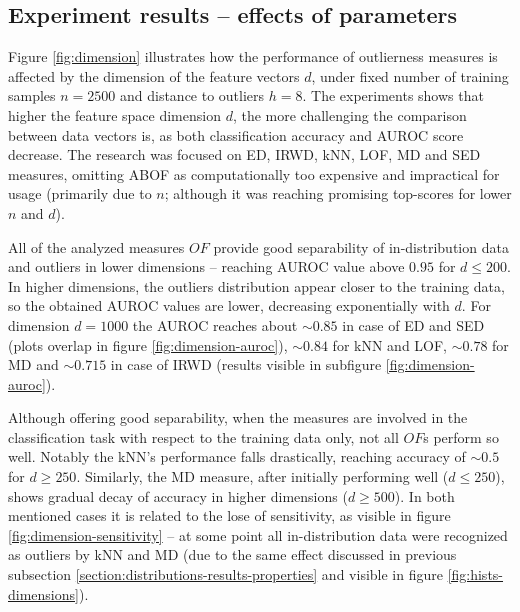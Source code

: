 \subsection{Experiment results – effects of parameters}
\label{section:distributions-results-trends}

Figure \ref{fig:dimension} illustrates how the performance of outlierness measures is affected by the dimension of the feature vectors $d$, under fixed number of training samples $n = 2500$ and distance to outliers $h = 8$. The experiments shows that higher the feature space dimension $d$, the more challenging the comparison between data vectors is, as both classification accuracy and AUROC score decrease. The research was focused on ED, IRWD, kNN, LOF, MD and SED measures, omitting ABOF as computationally too expensive and impractical for usage (primarily due to $n$; although it was reaching promising top-scores for lower $n$ and $d$).

All of the analyzed measures $OF$ provide good separability of in-distribution data and outliers in lower dimensions – reaching AUROC value above $0.95$ for $d \leq 200$. In higher dimensions, the outliers distribution appear closer to the training data, so the obtained AUROC values are lower, decreasing exponentially with $d$. For dimension $d = 1000$ the AUROC reaches about ${\sim}0.85$ in case of ED and SED (plots overlap in figure \ref{fig:dimension-auroc}), ${\sim}0.84$ for kNN and LOF, ${\sim}0.78$ for MD and ${\sim}0.715$ in case of IRWD (results visible in subfigure \ref{fig:dimension-auroc}).

Although offering good separability, when the measures are involved in the classification task with respect to the training data only, not all $OF$s perform so well. Notably the kNN's performance falls drastically, reaching accuracy of ${\sim}0.5$ for $d \geq 250$. Similarly, the MD measure, after initially performing well ($d \leq 250$), shows gradual decay of accuracy in higher dimensions ($d \geq 500$). In both mentioned cases it is related to the lose of sensitivity, as visible in figure \ref{fig:dimension-sensitivity} – at some point all in-distribution data were recognized as outliers by kNN and MD (due to the same effect discussed in previous subsection \ref{section:distributions-results-properties} and visible in figure \ref{fig:hists-dimensions}).

